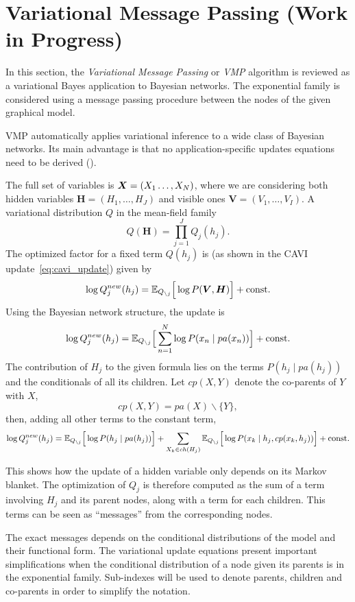 \section{Variational Message Passing (Work in Progress)}\label{sec:vmp}

In this section, the \emph{Variational Message Passing} or \emph{VMP} algorithm is reviewed as a variational Bayes application to Bayesian networks. The exponential family is considered using a message passing procedure between the nodes of the given graphical model.

VMP automatically applies variational inference to a wide class of Bayesian networks. Its main advantage is that no application-specific updates equations need to be derived (\cite{winn2005variational}).

The full set of variables is \( \bm{X} = (X_1\dots,X_N) \), where we are considering both hidden variables \( \bm{H} = (H_1,\dots,H_J) \) and visible ones \( \bm{V} = (V_{1}, \dots, V_{I})\). A variational distribution \( Q \) in the mean-field family
\[
   Q(\bm{H}) = \prod_{j=1}^J Q_{j}(h_j).
\]
The optimized factor for a fixed term \(Q(h_{j})\) is (as shown in the CAVI update~\ref{eq:cavi_update}) given by
\[
   \log Q_{j}^{new}(h_j) = \mathbb{E}_{Q_{\backslash j}}\Big[\log P(\bm{V}, \bm{H})\Big] + \text{const.}
\]
Using the Bayesian network structure, the update is
\[
  \log Q_{j}^{new}(h_j) = \mathbb{E}_{Q_{\backslash j}}\Big[ \sum_{n=1}^N \log P(x_n \mid pa(x_n))\Big] + \text{const.}
\]
The contribution of \(H_{j}\) to the given formula lies on the terms \( P(h_j \mid pa(h_j)) \) and the conditionals of all its children. Let \(cp(X,Y)\) denote the co-parents of \(Y\) with \(X\),
\[
  cp(X,Y) = pa(X)\backslash \{Y\},
\]
then, adding all other terms to the constant term,
\[
   \log Q_{j}^{new}(h_j) = \mathbb{E}_{Q_{\backslash j}}\Big[\log P(h_j \mid pa(h_j))\Big] + \sum_{X_k \in ch(H_j)} \mathbb{E}_{Q_{\backslash j}}\Big[\log P(x_k \mid h_{j},cp(x_k, h_{j}))\Big] + \text{const.}
\]

This shows how the update of a hidden variable only depends on its Markov blanket. The optimization of \( Q_j \) is therefore computed as the sum of a term involving \( H_j \) and its parent nodes, along with a term for each children. This terms can be seen as ``messages'' from the corresponding nodes.

The exact messages depends on the conditional distributions of the model and their functional form. The variational update equations present important simplifications when the conditional distribution of a node given its parents is in the exponential family. Sub-indexes will be used to denote parents, children and co-parents in order to simplify the notation.

